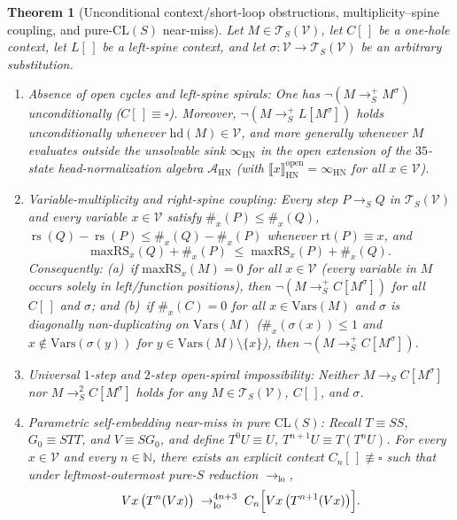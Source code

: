 \documentclass[11pt,reqno]{amsart}
\numberwithin{equation}{section}
\theoremstyle{plain}
\newtheorem{theorem}{Theorem}[section]
\theoremstyle{definition}
\theoremstyle{remark}
\DeclareMathOperator{\rs}{rs}
\newcommand{\CLS}{\mathrm{CL}(S)}
\newcommand{\TSV}{\mathcal{T}_S(\mathcal{V})}
\newcommand{\HN}{\mathrm{HN}}
\newcommand{\sem}[1]{\llbracket #1 \rrbracket}
\newcommand{\redS}{\to_S}
\newcommand{\redSp}{\to_S^+}
\begin{document}
\begin{theorem}[Unconditional context/short-loop obstructions, multiplicity--spine coupling, and pure-$\CLS$ near-miss]\label{thm:conj17-unconditional-and-coupling}
Let $M \in \TSV$, let $C[\,]$ be a one-hole context, let $L[\,]$ be a left-spine context, and let $\sigma \colon \mathcal{V} \to \TSV$ be an arbitrary substitution.
\begin{enumerate}[label=(\roman*),leftmargin=2.2em]
  \item \emph{Absence of open cycles and left-spine spirals:} One has $\neg(M \redSp M^\sigma)$ unconditionally ($C[\,] \equiv \square$). Moreover, $\neg(M \redSp L[M^\sigma])$ holds unconditionally whenever $\mathrm{hd}(M) \in \mathcal{V}$, and more generally whenever $M$ evaluates outside the unsolvable sink $\infty_{\HN}$ in the open extension of the $35$-state head-normalization algebra $\mathcal{A}_{\HN}$ (with $\sem{x}_{\HN}^{\mathrm{open}} = \infty_{\HN}$ for all $x \in \mathcal{V}$).
  \item \emph{Variable-multiplicity and right-spine coupling:} Every step $P \redS Q$ in $\TSV$ and every variable $x \in \mathcal{V}$ satisfy $\#_x(P) \le \#_x(Q)$, $\rs(Q) - \rs(P) \le \#_x(Q) - \#_x(P)$ whenever $\mathrm{rt}(P) \equiv x$, and
  \begin{equation}\label{eq:maxrs-coupling}
    \mathrm{maxRS}_x(Q) + \#_x(P) \;\le\; \mathrm{maxRS}_x(P) + \#_x(Q).
  \end{equation}
  Consequently: (a)~if $\mathrm{maxRS}_x(M) = 0$ for all $x \in \mathcal{V}$ (every variable in $M$ occurs solely in left/function positions), then $\neg(M \redSp C[M^\sigma])$ for all $C[\,]$ and $\sigma$; and (b)~if $\#_x(C) = 0$ for all $x \in \mathrm{Vars}(M)$ and $\sigma$ is diagonally non-duplicating on $\mathrm{Vars}(M)$ ($\#_x(\sigma(x)) \le 1$ and $x \notin \mathrm{Vars}(\sigma(y))$ for $y \in \mathrm{Vars}(M) \setminus \{x\}$), then $\neg(M \redSp C[M^\sigma])$.
  \item \emph{Universal $1$-step and $2$-step open-spiral impossibility:} Neither $M \redS C[M^\sigma]$ nor $M \redS^2 C[M^\sigma]$ holds for any $M \in \TSV$, $C[\,]$, and $\sigma$.
  \item \emph{Parametric self-embedding near-miss in pure $\CLS$:} Recall $T \equiv S S$, $G_0 \equiv S T T$, and $V \equiv S G_0$, and define $T^0 U \equiv U$, $T^{n+1} U \equiv T(T^n U)$. For every $x \in \mathcal{V}$ and every $n \in \mathbb{N}$, there exists an explicit context $C_n[\,] \not\equiv \square$ such that under leftmost-outermost pure-$S$ reduction $\to_{\mathrm{lo}}$,
  \begin{equation}\label{eq:parametric-near-miss}
    V x\,\bigl(T^n(V x)\bigr) \;\to_{\mathrm{lo}}^{4n+3}\; C_n\Bigl[V x\,\bigl(T^{n+1}(V x)\bigr)\Bigr].
  \end{equation}
\end{enumerate}
\end{theorem}
\end{document}
